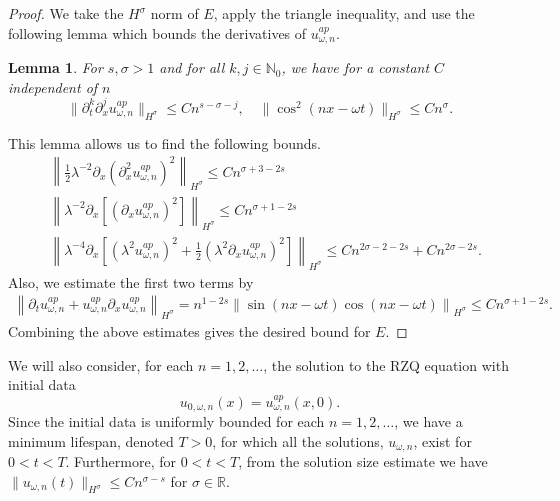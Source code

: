 \documentclass[reqno]{amsart}
\theoremstyle{plain}
\newtheorem{lemma}{Lemma}[section]
\numberwithin{equation}{section}
\begin{document}
\begin{proof}
We take the $H^\sigma$ norm of $E$, apply the triangle inequality, and use the following lemma which bounds the derivatives of $u^{ap}_{\omega, n}$. 
\begin{lemma}
For $s, \sigma>1$ and for all $k, j \in \mathbb N_0$, we have for a constant $C$ independent of $n$
$$
\|    \partial_t ^k \partial_x^j u^{ap}_{\omega, n}  \|_{H^\sigma} \le C  n^{s-\sigma - j} , \quad \|    \cos ^2 (nx-\omega t)  \|_{H^\sigma} \le C  n^{ \sigma}. 
$$
\end{lemma}
This lemma allows us to find  the following  bounds. 
\begin{align}
 & 
\left \|  \frac12 \lambda^{-2} \partial_x ( \partial_x^2  u^{ap}_{\omega, n})^2     \right \| _{H^\sigma} \le 
C n^{\sigma+3 -2s}
\\
& 
\left \|   \lambda^{-2}  \partial_x \left [( \partial_x  u^{ap}_{\omega, n} )^2   \right ]     \right \| _{H^\sigma} \le 
C n^{\sigma +1  -2s}
\\ &  
\left  \|   \lambda^{-4} \partial_x \left [  ( \lambda ^2    u^{ap}_{\omega, n} )^2 +\frac12 (\lambda^2  \partial_x  u^{ap}_{\omega, n} )^2 
   \right ]    \right  \| _{H^\sigma} \le 
C n^{2 \sigma -2  -2 s}+ 
C n^{2 \sigma  -2 s}. 
\end{align}
Also, we estimate the first two terms by
\begin{align} 
\left \| 
\partial_t  u^{ap}_{\omega, n}  +   u^{ap}_{\omega, n} \partial_ x  u^{ap}_{\omega, n}   \right  \| _{H^\sigma} 
=n^{1-2s} \left\| \sin(nx-\omega t) \cos(nx-\omega t) \right\|_{H^\sigma} 
\le C n^{\sigma +1-2s}. 
\end{align}
Combining the above estimates gives the desired bound for $E$. 
\end{proof}



We will also consider, for each $n=1,2,\dots$, the solution to the RZQ equation with initial data
$$
u_{0,\omega, n}(x) = u^{ap}_{\omega, n} (x,0).
$$
 Since the initial data is uniformly bounded for each $n = 1,2,\dots$, we have  a minimum lifespan, denoted $T>0$, for which all the solutions, $u_{\omega, n} $, exist for $0<t<T$. Furthermore, for $0<t<T$, from the solution size estimate we have   $\| u_{\omega, n}  (t)  \| _{H^\sigma} \le C n^{\sigma -s} $ for $ \sigma \in \mathbb R$. 
 
\end{document}
